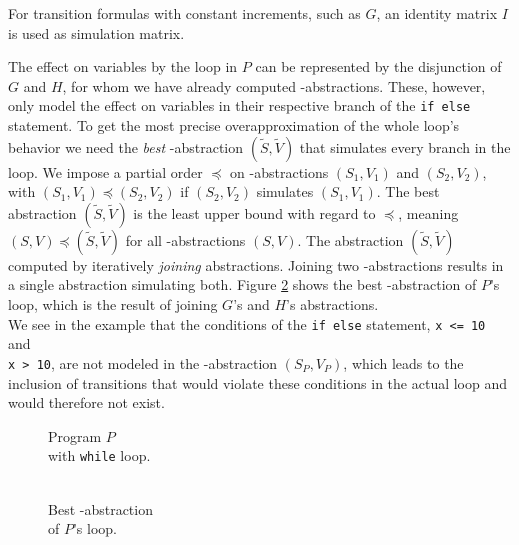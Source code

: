 For transition formulas with constant increments, such as $G$, an identity matrix $I$ is used as simulation matrix. \par
The effect on variables by the loop in $P$ can be represented by the disjunction of $G$ and $H$, for whom we have already computed \qvasr-abstractions. These, however, only model the effect on variables in their respective branch of the \texttt{if else} statement. To get the most precise overapproximation of the whole loop's behavior we need the \textsl{best} \qvasr-abstraction $(\tilde{S}, \tilde{V})$ that simulates every branch in the loop.
We impose a partial order $\preceq$ on \qvasr-abstractions $(S_1, V_1)$ and $(S_2, V_2)$, with $(S_1, V_1) \preceq (S_2, V_2)$ if $(S_2, V_2)$ simulates $(S_1, V_1)$. The best abstraction $(\tilde{S}, \tilde{V})$ is the least upper bound with regard to $\preceq$, meaning $(S, V) \preceq (\tilde{S}, \tilde{V})$ for all \qvasr-abstractions $(S, V)$. The abstraction $(\tilde{S}, \tilde{V})$ computed by iteratively \textsl{joining} abstractions. Joining two \qvasr-abstractions results in a single abstraction simulating both. Figure \ref{vasr} shows the best \qvasr-abstraction of $P$'s loop, which is the result of joining $G$'s and $H$'s abstractions. \\

We see in the example that the conditions of the \texttt{if else} statement, \texttt{x <= 10} and \\ \texttt{x > 10}, are not modeled in the \qvasr-abstraction $(S_P, V_P)$, which leads to the inclusion of transitions that would violate these conditions in the actual loop and would therefore not exist. \\

\begin{minipage}[t]{0.3\textwidth} \centering
	\begin{figure}[H]
		
		\caption{Program $P$ \\ with \texttt{while} loop.}
		\label{code}
	\end{figure}
\end{minipage}
\begin{minipage}[t]{\textwidth} \centering
	\begin{figure}[H]
			
			\caption{\\ Best \qvasr-abstraction \\ of $P$'s loop.}
			\label{vasr}
	\end{figure}
\end{minipage}
\vspace*{1cm}

